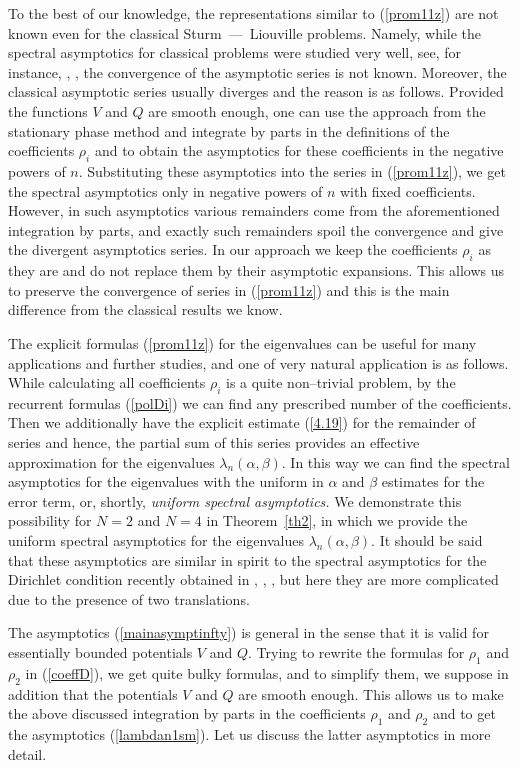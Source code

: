 \documentclass[10pt, a4paper]{article}
\theoremstyle{plain}
\theoremstyle{definition}
\numberwithin{equation}{section}
\def\l{\lambda}
\def\a{\alpha}
\def\b{\beta}
\begin{document}
To the best of our knowledge, the representations similar to (\ref{prom11z}) are not known even for the classical Sturm~---~Liouville problems. Namely, while the spectral asymptotics for classical problems were studied very well, see, for instance, \cite{Marchenko}, \cite{LS}, the convergence of the asymptotic series is not known. Moreover, the classical  asymptotic series usually diverges and the reason is as follows. Provided the functions $V$ and $Q$ are smooth enough, one can use the approach from the stationary phase method and integrate by parts in the definitions of the coefficients $\rho_i$ and to obtain the asymptotics for these coefficients in the negative powers of $n.$ Substituting these asymptotics into the series in (\ref{prom11z}), we get the spectral asymptotics only in negative powers of $n$ with fixed coefficients. However, in such asymptotics various remainders come from the aforementioned integration by parts, and exactly such remainders spoil the convergence and give the divergent asymptotics series. In our approach we keep the coefficients $\rho_i$ as they are and do not replace them by their asymptotic expansions. This allows us to preserve the convergence of series in (\ref{prom11z}) and this is the main difference from the classical results we know.


The explicit formulas (\ref{prom11z}) for the eigenvalues can be useful for many applications and further studies, and one of very natural application is as follows. While calculating all coefficients $\rho_i$ is a quite non--trivial problem, by the recurrent formulas (\ref{polDi}) we can find any prescribed number of the coefficients. Then we additionally have the explicit estimate (\ref{4.19}) for the remainder of series and hence, the partial sum of this series provides an effective approximation for the eigenvalues $\l_n(\a,\b).$ In this way we can find the spectral asymptotics for the eigenvalues with the uniform in $\a$ and $\b$ estimates for the error term, or, shortly, \textit{uniform spectral asymptotics.} We demonstrate this possibility for $N=2$ and $N=4$ in Theorem~\ref{th2}, in which we provide the uniform spectral asymptotics for the eigenvalues $\l_n(\a,\b).$  It should be said that these asymptotics are similar in spirit to the spectral asymptotics for the  Dirichlet condition recently obtained in   \cite{Borisov_PolyakovDAN}, \cite{Borisov_PolyakovIZV}, \cite{Borisov_PolyakovUMJ}, but here they are more complicated due to the presence of two translations.


The asymptotics (\ref{mainasymptinfty}) is general  in the sense that it is valid for essentially bounded potentials $V$ and $Q.$ Trying to rewrite the formulas for $\rho_1$ and $\rho_2$ in (\ref{coeffD}), we get quite bulky formulas, and to simplify them, we suppose in addition that the potentials $V$ and $Q$  are smooth enough. This allows us to make the above discussed integration by parts in the coefficients $\rho_1$ and $\rho_2$ and to get the asymptotics (\ref{lambdan1sm}).  Let us discuss the latter asymptotics in more detail.
\end{document}
